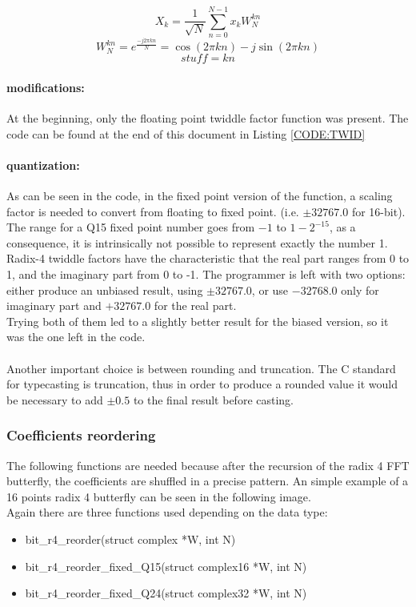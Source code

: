 \documentclass[a4paper]{article}
\begin{document}
\begin{equation}\label{eq:FFT}
X_k = \frac{1}{\sqrt{N}}\sum_{n=0}^{N-1} x_k W_N^{kn}
\end{equation}
$$W_N^{kn} = e^{\frac{-j2\pi kn}{N}} = \cos{(2\pi kn)} - j\sin{(2\pi kn)}$$
$$\mathit{stuff} = kn$$

\paragraph{modifications:}
At the beginning, only the floating point twiddle factor function was present.
The code can be found at the end of this document in Listing \ref{CODE:TWID}

\paragraph{quantization:}
As can be seen in the code, in the fixed point version of the function, a scaling factor is needed to convert from floating to fixed point. (i.e. $\pm32767.0$ for 16-bit).
The range for a Q15 fixed point number goes from $-1$ to $1-2^{-15}$, as a consequence, it is intrinsically not possible to represent exactly the number 1.\\
Radix-4 twiddle factors have the characteristic that the real part ranges from 0 to 1, and the imaginary part from 0 to -1.
The programmer is left with two options: either produce an unbiased result, using $\pm32767.0$, or use $-32768.0$ only for imaginary part and $+32767.0$ for the real part.\\
Trying both of them led to a slightly better result for the biased version, so it was the one left in the code.\\\\
Another important choice is between rounding and truncation. The C standard for typecasting is truncation, thus in order to produce a rounded value it would be necessary to add $\pm0.5$ to the final result before casting.

\subsubsection{Coefficients reordering}
The following functions are needed because after the recursion of the radix 4 FFT butterfly, the coefficients are shuffled in a precise pattern. An simple example of a 16 points radix 4 butterfly can be seen in the following image.\\ 
Again there are three functions used depending on the data type:
\begin{itemize}
	\item bit\_r4\_reorder(struct complex *W, int N)
	\item bit\_r4\_reorder\_fixed\_Q15(struct complex16 *W, int N)
	\item bit\_r4\_reorder\_fixed\_Q24(struct complex32 *W, int N)
\end{itemize}
\end{document}
